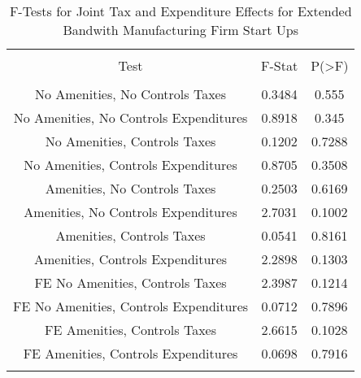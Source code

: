
\begin{table}[!htbp] \centering 
  \caption{F-Tests for Joint Tax and Expenditure Effects for Extended Bandwith Manufacturing Firm Start Ups} 
  \label{31-33Ftests} 
\begin{tabular}{@{\extracolsep{5pt}} ccc} 
\\[-1.8ex]\hline 
\hline \\[-1.8ex] 
Test & F-Stat & P(\textgreater F) \\ 
\hline \\[-1.8ex] 
No Amenities, No Controls Taxes & 0.3484 & 0.555 \\ 
No Amenities, No Controls Expenditures & 0.8918 & 0.345 \\ 
No Amenities, Controls Taxes & 0.1202 & 0.7288 \\ 
No Amenities, Controls Expenditures & 0.8705 & 0.3508 \\ 
Amenities, No Controls Taxes & 0.2503 & 0.6169 \\ 
Amenities, No Controls Expenditures & 2.7031 & 0.1002 \\ 
Amenities, Controls Taxes & 0.0541 & 0.8161 \\ 
Amenities, Controls Expenditures & 2.2898 & 0.1303 \\ 
FE No Amenities, Controls Taxes & 2.3987 & 0.1214 \\ 
FE No Amenities, Controls Expenditures & 0.0712 & 0.7896 \\ 
FE Amenities, Controls Taxes & 2.6615 & 0.1028 \\ 
FE Amenities, Controls Expenditures & 0.0698 & 0.7916 \\ 
\hline \\[-1.8ex] 
\end{tabular} 
\end{table} 
